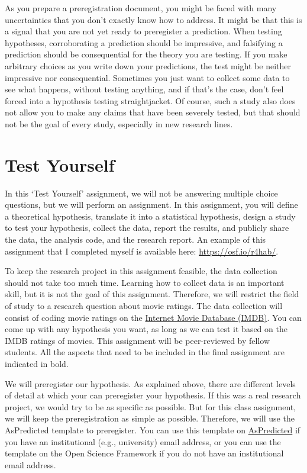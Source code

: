 \documentclass[
  oneside]{krantz}
\begin{document}
As you prepare a preregistration document, you might be faced with many uncertainties that you don't exactly know how to address. It might be that this is a signal that you are not yet ready to preregister a prediction. When testing hypotheses, corroborating a prediction should be impressive, and falsifying a prediction should be consequential for the theory you are testing. If you make arbitrary choices as you write down your predictions, the test might be neither impressive nor consequential. Sometimes you just want to collect some data to see what happens, without testing anything, and if that's the case, don't feel forced into a hypothesis testing straightjacket. Of course, such a study also does not allow you to make any claims that have been severely tested, but that should not be the goal of every study, especially in new research lines.

\hypertarget{test-yourself-11}{%
\section{Test Yourself}\label{test-yourself-11}}

In this `Test Yourself' assignment, we will not be answering multiple choice questions, but we will perform an assignment. In this assignment, you will define a theoretical hypothesis, translate it into a statistical hypothesis, design a study to test your hypothesis, collect the data, report the results, and publicly share the data, the analysis code, and the research report. An example of this assignment that I completed myself is available here: \url{https://osf.io/r4hab/}.

To keep the research project in this assignment feasible, the data collection should not take too much time. Learning how to collect data is an important skill, but it is not the goal of this assignment. Therefore, we will restrict the field of study to a research question about movie ratings. The data collection will consist of coding movie ratings on the \href{https://www.imdb.com/}{Internet Movie Database (IMDB)}. You can come up with any hypothesis you want, as long as we can test it based on the IMDB ratings of movies. This assignment will be peer-reviewed by fellow students. All the aspects that need to be included in the final assignment are indicated in bold.

We will preregister our hypothesis. As explained above, there are different levels of detail at which your can preregister your hypothesis. If this was a real research project, we would try to be as specific as possible. But for this class assignment, we will keep the preregistration as simple as possible. Therefore, we will use the AsPredicted template to preregister. You can use this template on \href{https://aspredicted.org}{AsPredicted} if you have an institutional (e.g., university) email address, or you can use the template on the Open Science Framework if you do not have an institutional email address.
\end{document}
